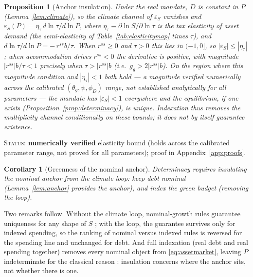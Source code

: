 \documentclass[12pt]{article}
\newtheorem{proposition}{Proposition}
\newtheorem{corollary}{Corollary}
\newcommand{\Sfun}{S}
\begin{document}
\begin{proposition}[Anchor insulation]\label{prop:insulation}
Under the real mandate, $D$ is constant in $P$ (Lemma~\ref{lem:climate}), so
the climate channel of $\varepsilon_S$ vanishes and
$\varepsilon_S(P) = \eta_\tau\, d\ln\tau/d\ln P$, where
$\eta_\tau \equiv \partial\ln\Sfun/\partial\ln\tau$ is the tax
\emph{elasticity} of asset demand (the semi-elasticity of
Table~\ref{tab:elasticitymap} times $\tau$), and
$d\ln\tau/d\ln P = -\,r^{ss}b/\tau$. When $r^{ss}\ge0$ and $\tau>0$ this
lies in $(-1,0]$, so $|\varepsilon_S|\le|\eta_\tau|$; when accommodation
drives $r^{ss}<0$ the derivative is positive, with magnitude
$|r^{ss}|b/\tau<1$ precisely when $\tau>|r^{ss}|b$ (i.e.\ $g_g>2|r^{ss}|b$).
On the region where this magnitude condition and $|\eta_\tau|<1$ both hold
--- a magnitude verified numerically across the calibrated
$(\theta_g,\psi,\phi_D)$ range, not established analytically for all
parameters --- the mandate has $|\varepsilon_S|<1$ everywhere and the
equilibrium, if one exists (Proposition~\ref{prop:determinacy}), is
unique. Indexation thus removes the multiplicity channel conditionally on
these bounds; it does not by itself guarantee existence.
\end{proposition}
\noindent\textsc{Status:} \textbf{numerically verified} elasticity bound (holds
across the calibrated parameter range, not proved for all parameters); proof in
Appendix~\ref{app:proofs}.

\begin{corollary}[Greenness of the nominal anchor]\label{cor:anchor}
Determinacy requires insulating the nominal anchor from the climate loop:
keep debt nominal (Lemma~\ref{lem:anchor} provides the anchor), and
index the green budget (removing the loop).
\end{corollary}

Two remarks follow. Without the climate loop, nominal-growth rules
guarantee uniqueness for any shape of $\Sfun$ \citep{hagedorn2026dtpl}; with
the loop, the guarantee survives only for indexed spending, so the ranking of
nominal versus indexed rules is reversed for the spending line and unchanged
for debt. And full indexation (real debt and real spending together)
removes every nominal object from \eqref{eq:assetmarket}, leaving $P$
indeterminate for the classical reason \citep{sargentwallace1975}: insulation
concerns where the anchor sits, not whether there is one.
\end{document}
